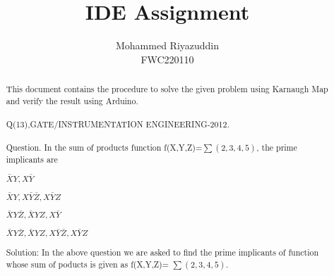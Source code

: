\documentclass{IEEEtran}
\newcommand{\choice}{\item}
\begin{document}
\title{IDE Assignment}
\author{Mohammed Riyazuddin 
\\ FWC220110}
 \maketitle
 \begin{abstract}
  This document contains the procedure to solve the given problem using Karnaugh Map and verify the result using Arduino.
  \\
  \\Q(13),GATE/INSTRUMENTATION ENGINEERING-2012.\\\\
 Question. In the sum of products function f(X,Y,Z)=$\sum{(2,3,4,5)}$, the prime implicants are
  \begin{choices}[twocol]
\choice $\bar{X}Y,X\bar{Y}$ 		
\choice $\bar{X}Y,X\bar{Y}\bar{Z},X\bar{Y}Z$
\choice $\bar{X}Y\bar{Z},\bar{X}YZ,X\bar{Y}$    
\choice $\bar{X}Y\bar{Z},\bar{X}YZ,X\bar{Y}\bar{Z},X\bar{Y}Z$
\end{choices} 
 Solution: In the above question we are asked to find the prime implicants of function whose sum of poducts is given as f(X,Y,Z)= $\sum (2,3,4,5) $.
 

\end{abstract}
\end{document}
